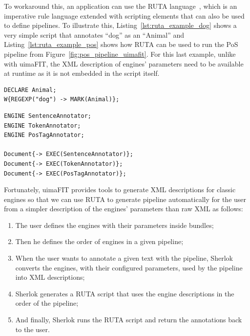 \documentclass{article}
\begin{document}
To workaround this, an application can use the RUTA language~\cite{ruta}, which is an imperative
rule language extended with scripting elements that can also be used to define pipelines. To
illustrate this, Listing~\ref{lst:ruta_example_dog} shows a very simple script that annotates
``dog'' as an ``Animal'' and Listing~\ref{lst:ruta_example_pos} shows how RUTA can be used to run
the PoS pipeline from Figure~\ref{fig:pos_pipeline_uimafit}. For this last example, unlike with
uimaFIT, the XML description of engines' parameters need to be available at runtime as it is not
embedded in the script itself.

\begin{lstlisting}[float,language=ruta,
                   caption=A basic RUTA script,
                   label=lst:ruta_example_dog]
DECLARE Animal;
W{REGEXP("dog") -> MARK(Animal)};
\end{lstlisting}

\begin{lstlisting}[float,language=ruta,
                   caption=PoS pipeline written in RUTA,
                   label=lst:ruta_example_pos]
ENGINE SentenceAnnotator;
ENGINE TokenAnnotator;
ENGINE PosTagAnnotator;

Document{-> EXEC(SentenceAnnotator)};
Document{-> EXEC(TokenAnnotator)};
Document{-> EXEC(PosTagAnnotator)};
\end{lstlisting}

Fortunately, uimaFIT provides tools to generate XML descriptions for classic engines so that we can
use RUTA to generate pipeline automatically for the user from a simpler description of the engines'
parameters than raw XML as follows:

\begin{enumerate}
    \item The user defines the engines with their parameters inside bundles;
    \item Then he defines the order of engines in a given pipeline;
    \item When the user wants to annotate a given text with the pipeline, Sherlok converts the
        engines, with their configured parameters, used by the pipeline into XML descriptions;
    \item Sherlok generates a RUTA script that uses the engine descriptions in the order of the
        pipeline;
    \item And finally, Sherlok runs the RUTA script and return the annotations back to the user.
\end{enumerate}
\end{document}
